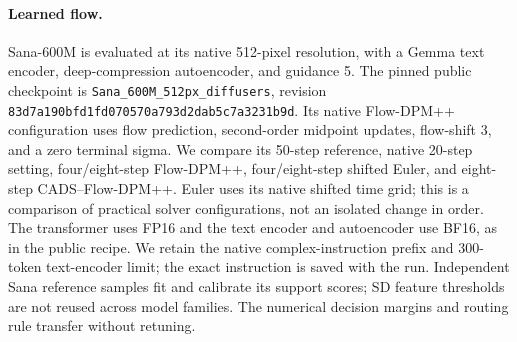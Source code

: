 \paragraph{Learned flow.}
Sana-600M \cite{xie2025sana} is evaluated at its native 512-pixel resolution,
with a Gemma text encoder, deep-compression autoencoder, and guidance 5. The
pinned public checkpoint is
\texttt{Sana\_600M\_512px\_diffusers}, revision
\texttt{83d7a190bfd1fd070570\allowbreak{}a793d2dab5c7a3231b9d}. Its native Flow-DPM++
configuration uses flow prediction, second-order midpoint updates, flow-shift
3, and a zero terminal sigma. We compare its 50-step reference, native
20-step setting, four/eight-step Flow-DPM++, four/eight-step shifted Euler, and
eight-step CADS--Flow-DPM++. Euler uses its native shifted time grid; this is a
comparison of practical solver configurations, not an isolated change in order.
The transformer uses FP16 and the text encoder and autoencoder use BF16, as in
the public recipe. We retain the native complex-instruction prefix and
300-token text-encoder limit; the exact instruction is saved with the run.
Independent Sana reference samples fit and calibrate its
support scores; SD feature thresholds are not reused across model families.
The numerical decision margins and routing rule transfer without retuning.

